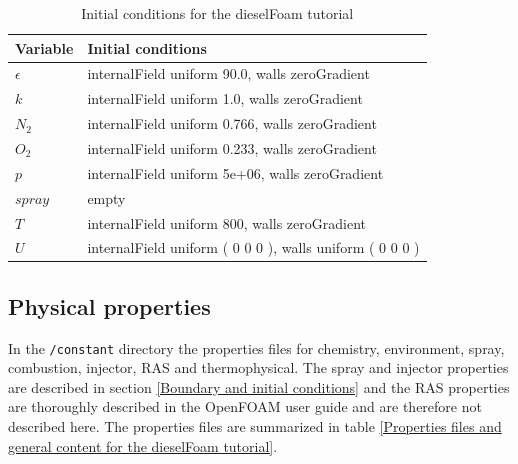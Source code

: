 \documentclass{report}
\begin{document}
\begin{table}[h]
\begin{center}
\begin{tabular}{l|l}
	Variable & Initial conditions  \\ \hline
	 $\epsilon$ 	& internalField       uniform 90.0,   		walls    	zeroGradient\\
	 $k$ 		& internalField       uniform 1.0,		walls		zeroGradient\\
	 $N_2$		& internalField       uniform 0.766, 		walls		zeroGradient\\
	 $O_2$		& internalField       uniform 0.233,  		walls		zeroGradient \\
	 $p$		& internalField       uniform 5e+06, 		walls		zeroGradient  \\
	 $spray$	& empty  \\
	 $T$		& internalField       uniform 800,  		walls		zeroGradient  \\
	 $U$		& internalField       uniform ( 0 0 0 ), 	walls		uniform ( 0 0 0 )  \\	  
\end{tabular}
\caption{Initial conditions for the dieselFoam tutorial}
\label{Initial conditions for the dieselFoam tutorial}
\end{center}
\end{table}
\newpage
\subsection{Physical properties}
In the \verb+/constant+ directory the properties files for chemistry, environment, spray, combustion, injector, RAS and thermophysical. The spray and injector properties are described in section \ref{Boundary and initial conditions} and the RAS properties are thoroughly described in the OpenFOAM user guide and are therefore not described here. The properties files are summarized in table \ref{Properties files and general content for the dieselFoam tutorial}.        
\end{document}
